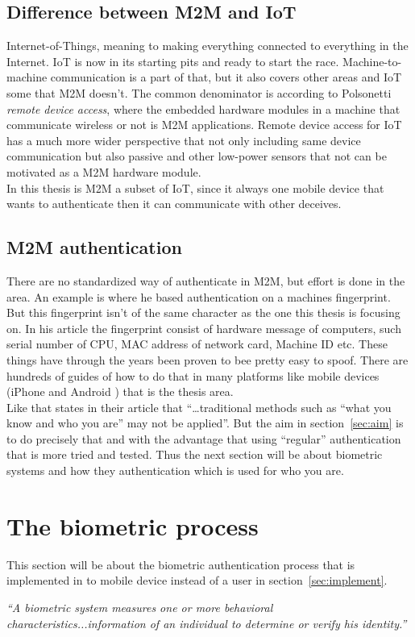 \subsection{Difference between M2M and IoT}
Internet-of-Things, meaning to making everything connected to everything in the Internet. IoT is now in its starting pits and ready to start the race. Machine-to-machine communication is a part of that, but it also covers other areas and IoT some that M2M doesn't. The common denominator is according to Polsonetti \textit{remote device access}, where the embedded hardware modules in a machine that communicate wireless or not is M2M applications. Remote device access for IoT has a much more wider perspective that not only including same device communication but also passive and other low-power sensors that not can be motivated as a M2M hardware module.
\cite[]{cpM2MIoT}\\
In this thesis is M2M a subset of IoT, since it always one mobile device that wants to authenticate then it can communicate with other deceives.

\subsection{M2M authentication}
There are no standardized way of authenticate in M2M, but effort is done in the area. An example is \cite[]{auth:M2M} where he based authentication on a machines fingerprint. But this fingerprint isn't of the same character as the one this thesis is focusing on. In his article the fingerprint consist of hardware message of computers, such serial number of CPU, MAC address of network card, Machine ID etc. These things have through the years been proven to bee pretty easy to spoof. There are hundreds of guides of how to do that in many platforms like mobile devices (iPhone \cite[]{spoofMaciPhone} and Android \cite[]{spoofMacAndriod}) that is the thesis area. \\
Like \cite[]{auth:M2Mcom} that states in their article that ``\dots traditional methods such as “what you know and who you are” may not be applied''. But the aim in section~\ref{sec:aim} is to do precisely that and with the advantage that using ``regular'' authentication that is more  tried and tested. Thus the next section will be about biometric systems and how they authentication which is used for who you are.


\section{The biometric process}\label{sec:biometric}
This section will be about the biometric authentication process that is implemented in to mobile device instead of a user in section~\ref{sec:implement}. \\
\begin{center}\textit{``A biometric system measures one or more behavioral characteristics...information of an individual to determine or verify his identity.''} \cite[p.~3]{introbio}\end{center}

